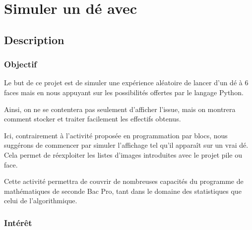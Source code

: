 \section{Simuler un dé avec \mbpy}


%
\pagestyle{mbpy} %

\subsection{Description}

\subsubsection{Objectif}


\begin{formule}
Le but de ce projet est de simuler une expérience aléatoire de lancer d’un dé à 6 faces mais en nous appuyant sur les possibilités offertes par le langage Python.

Ainsi, on ne se contentera pas seulement d'afficher l'issue, mais on montrera comment stocker et traiter facilement les effectifs obtenus. 

Ici, contrairement à l'activité proposée en programmation par blocs, nous suggérons de commencer par simuler l’affichage tel qu’il apparaît sur un vrai dé. Cela permet de réexploiter les listes d’images introduites avec le projet pile ou face.

Cette activité permettra de couvrir de nombreuses capacités du programme de mathématiques de seconde Bac Pro, tant dans le domaine des statistiques que celui de l'algorithmique.

\end{formule}


\subsubsection{Intérêt}


